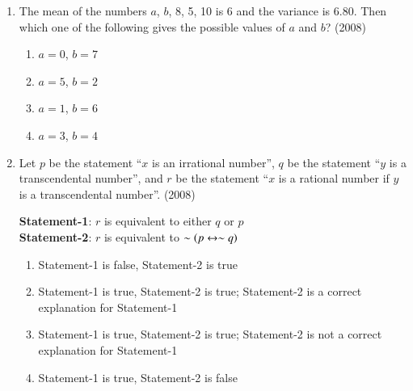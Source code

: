 \documentclass[journal]{IEEEtran}
\begin{document}
\begin{enumerate}
        \begin{multicols}{2}
            \begin{enumerate}
                \item 5 kg and 12 kg
                \item 5 kg and 13 kg
                \item 12 kg and 13 kg
                \item 5 kg and 5 kg
            \end{enumerate} 
        \end{multicols}

    \item The mean of the numbers $a$, $b$, 8, 5, 10 is 6 and
        the variance is $6.80$. Then which one of the following
        gives the possible values of $a$ and $b$?
        \hfill (2008)

        \begin{multicols}{2}
            \begin{enumerate}
                \item $a = 0$, $b = 7$
                \item $a = 5$, $b = 2$
                \item $a = 1$, $b = 6$
                \item $a = 3$, $b = 4$
            \end{enumerate}
        \end{multicols}

    \item Let $p$ be the statement ``$x$ is an irrational number'',
        $q$ be the statement ``$y$ is a transcendental number'',
        and $r$ be the statement ``$x$ is a rational number if
        $y$ is a transcendental number''.
        \hfill (2008)

        \textbf{Statement-1}: $r$ is equivalent to either $q$ or $p$ \\
        \textbf{Statement-2}: $r$ is equivalent to $\sim \left(p \leftrightarrow \sim q\right)$

        \begin{enumerate}
            \item Statement-1 is false, Statement-2 is true
            \item Statement-1 is true, Statement-2 is true;
                Statement-2 is a correct explanation for Statement-1
            \item Statement-1 is true, Statement-2 is true;
                Statement-2 is not a correct explanation for Statement-1
            \item Statement-1 is true, Statement-2 is false
        \end{enumerate}


\end{enumerate}
\end{document}
